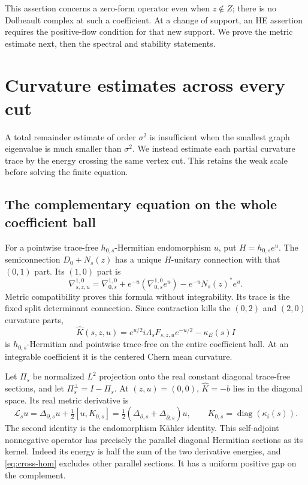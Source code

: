 \documentclass[11pt]{amsart}
\theoremstyle{definition}
\theoremstyle{remark}
\newcommand{\diag}{\operatorname{diag}}
\begin{document}
This assertion concerns a zero-form operator even when $z\notin Z$;
there is no Dolbeault complex at such a coefficient. At a change of support,
an HE assertion requires the positive-flow condition for that new support.
We prove the metric estimate next, then the spectral and stability statements.

\section{Curvature estimates across every cut}\label{sec:correction}

A total remainder estimate of order $\sigma^2$ is insufficient when the
smallest graph eigenvalue is much smaller than $\sigma^2$. We instead
estimate each partial curvature trace by the energy crossing the same
vertex cut. This retains the weak scale before solving the finite equation.

\subsection{The complementary equation on the whole coefficient ball}
For a pointwise trace-free $h_{0,s}$-Hermitian endomorphism $u$, put
$H=h_{0,s}e^u$. The semiconnection $D_0+N_s(z)$ has a unique
$H$-unitary connection with that $(0,1)$ part. Its $(1,0)$ part is
\begin{equation}\label{eq:ambient-connection}
 \nabla^{1,0}_{s,z,u}=\nabla_{0,s}^{1,0}
 +e^{-u}(\nabla_{0,s}^{1,0}e^u)-e^{-u}N_s(z)^*e^u.
\end{equation}
Metric compatibility proves this formula without integrability. Its trace
is the fixed split determinant connection. Since contraction kills the
$(0,2)$ and $(2,0)$ curvature parts,
\[
 \widehat K(s,z,u)
 =e^{u/2}i\Lambda_sF_{s,z,u}e^{-u/2}-\kappa_E(s)I
\]
is $h_{0,s}$-Hermitian and pointwise trace-free on the entire coefficient
ball. At an integrable coefficient it is the centered Chern mean curvature.

Let $\Pi_s$ be normalized $L^2$ projection onto the real constant diagonal
trace-free sections, and let $\Pi_s^\perp=I-\Pi_s$. At $(z,u)=(0,0)$,
$\widehat K=-b$ lies in the diagonal space. Its real metric derivative is
\begin{equation}\label{eq:split-linearization}
 \mathcal L_su=\Delta_{\partial,s}u+\tfrac12[u,K_{0,s}]
 =\tfrac12(\Delta_{\partial,s}+\Delta_{\bar\partial,s})u,
 \qquad K_{0,s}=\diag(\kappa_i(s)).
\end{equation}
The second identity is the endomorphism K\"ahler identity. This
self-adjoint nonnegative operator has precisely the parallel diagonal
Hermitian sections as its kernel. Indeed its energy is half the sum of
the two derivative energies, and \eqref{eq:cross-hom} excludes other
parallel sections. It has a uniform positive gap on the complement.
\end{document}
